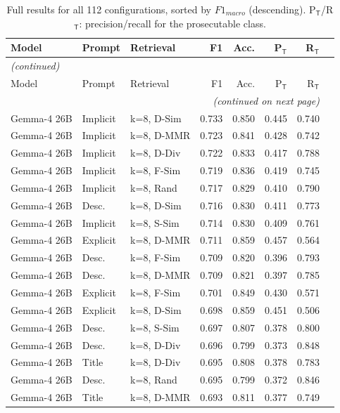 \begin{longtable}{lllrrrrr}
\caption{Full results for all 112 configurations, sorted by $F1_{macro}$ (descending). P$_\mathsf{T}$/R$_\mathsf{T}$: precision/recall for the prosecutable class.}\label{tab:d-full}\\
\toprule
Model & Prompt & Retrieval & F1 & Acc. & P$_\mathsf{T}$ & R$_\mathsf{T}$ \\
\midrule
\endfirsthead
\multicolumn{7}{l}{\small\textit{(continued)}} \\
\toprule
Model & Prompt & Retrieval & F1 & Acc. & P$_\mathsf{T}$ & R$_\mathsf{T}$ \\
\midrule
\endhead
\midrule
\multicolumn{7}{r}{\small\textit{(continued on next page)}} \\
\endfoot
\bottomrule
\endlastfoot
Gemma-4 26B & Implicit & k=8, D-Sim & 0.733 & 0.850 & 0.445 & 0.740 \\
Gemma-4 26B & Implicit & k=8, D-MMR & 0.723 & 0.841 & 0.428 & 0.742 \\
Gemma-4 26B & Implicit & k=8, D-Div & 0.722 & 0.833 & 0.417 & 0.788 \\
Gemma-4 26B & Implicit & k=8, F-Sim & 0.719 & 0.836 & 0.419 & 0.745 \\
Gemma-4 26B & Implicit & k=8, Rand & 0.717 & 0.829 & 0.410 & 0.790 \\
Gemma-4 26B & Desc. & k=8, D-Sim & 0.716 & 0.830 & 0.411 & 0.773 \\
Gemma-4 26B & Implicit & k=8, S-Sim & 0.714 & 0.830 & 0.409 & 0.761 \\
Gemma-4 26B & Explicit & k=8, D-MMR & 0.711 & 0.859 & 0.457 & 0.564 \\
Gemma-4 26B & Desc. & k=8, F-Sim & 0.709 & 0.820 & 0.396 & 0.793 \\
Gemma-4 26B & Desc. & k=8, D-MMR & 0.709 & 0.821 & 0.397 & 0.785 \\
Gemma-4 26B & Explicit & k=8, F-Sim & 0.701 & 0.849 & 0.430 & 0.571 \\
Gemma-4 26B & Explicit & k=8, D-Sim & 0.698 & 0.859 & 0.451 & 0.506 \\
Gemma-4 26B & Desc. & k=8, S-Sim & 0.697 & 0.807 & 0.378 & 0.800 \\
Gemma-4 26B & Desc. & k=8, D-Div & 0.696 & 0.799 & 0.373 & 0.848 \\
Gemma-4 26B & Title & k=8, D-Div & 0.695 & 0.808 & 0.378 & 0.783 \\
Gemma-4 26B & Desc. & k=8, Rand & 0.695 & 0.799 & 0.372 & 0.846 \\
Gemma-4 26B & Title & k=8, D-MMR & 0.693 & 0.811 & 0.377 & 0.749 \\

\end{longtable}
